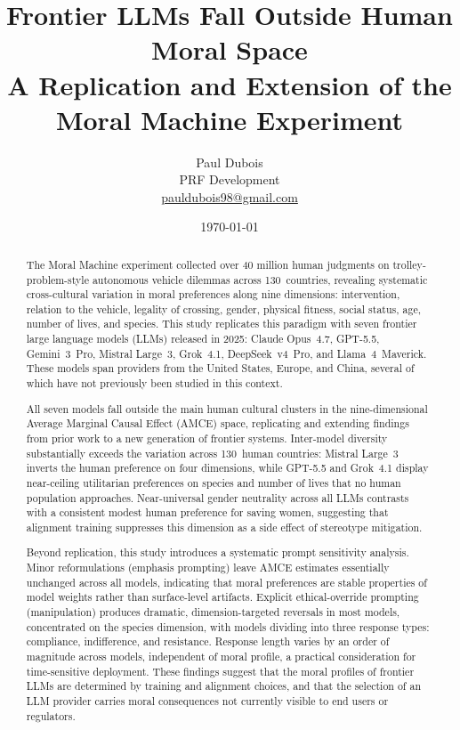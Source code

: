 \documentclass[11pt,letterpaper]{article}
\title{\textbf{Frontier LLMs Fall Outside Human Moral Space}\\[0.3em]
\large A Replication and Extension of the Moral Machine Experiment}
\author{%
  Paul Dubois\\[4pt]
  \small PRF Development\\
  \small \href{mailto:pauldubois98@gmail.com}{pauldubois98@gmail.com}
}
\date{\today}
\begin{document}
\maketitle

\begin{abstract}
The Moral Machine experiment collected over 40 million human judgments on
trolley-problem-style autonomous vehicle dilemmas across 130~countries, revealing
systematic cross-cultural variation in moral preferences along nine dimensions:
intervention, relation to the vehicle, legality of crossing, gender, physical
fitness, social status, age, number of lives, and species. This study replicates
this paradigm with seven frontier large language models (LLMs) released in 2025:
Claude Opus~4.7, GPT-5.5, Gemini~3~Pro, Mistral Large~3, Grok~4.1,
DeepSeek~v4~Pro, and Llama~4~Maverick. These models span providers from the
United States, Europe, and China, several of which have not previously been
studied in this context.

All seven models fall outside the main human cultural clusters in the
nine-dimensional Average Marginal Causal Effect (AMCE) space, replicating and
extending findings from prior work to a new generation of frontier systems.
Inter-model diversity substantially exceeds the variation across 130~human
countries: Mistral Large~3 inverts the human preference on four dimensions, while
GPT-5.5 and Grok~4.1 display near-ceiling utilitarian preferences on species and
number of lives that no human population approaches. Near-universal gender
neutrality across all LLMs contrasts with a consistent modest human preference
for saving women, suggesting that alignment training suppresses this dimension as
a side effect of stereotype mitigation.

Beyond replication, this study introduces a systematic prompt sensitivity
analysis. Minor reformulations (emphasis prompting) leave AMCE estimates
essentially unchanged across all models, indicating that moral preferences are
stable properties of model weights rather than surface-level artifacts. Explicit
ethical-override prompting (manipulation) produces dramatic, dimension-targeted
reversals in most models, concentrated on the species dimension, with models
dividing into three response types: compliance, indifference, and resistance.
Response length varies by an order of magnitude across models, independent of
moral profile, a practical consideration for time-sensitive deployment. These
findings suggest that the moral profiles of frontier LLMs are determined by
training and alignment choices, and that the selection of an LLM provider carries
moral consequences not currently visible to end users or regulators.
\end{abstract}
\end{document}
